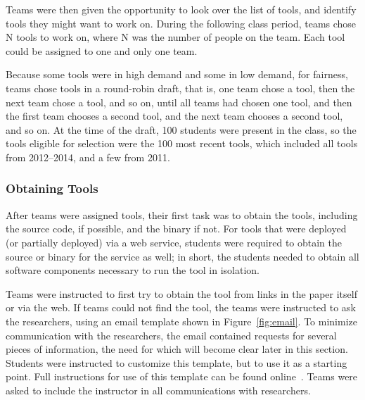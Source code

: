 \documentclass[10pt,conference]{IEEEtran}
\begin{document}
Teams were then given the opportunity to look over the list of
tools, and identify tools they might want to work on.
During the following class period, teams chose N tools to work on,
where N was the number of people on the team.
Each tool could be assigned to one and only one team.

Because some tools were in high demand and some in low demand, for fairness,
teams chose tools in a round-robin draft,
that is, one team chose a tool, then the next team chose a tool, and so on,
until all teams had chosen one tool, and then the first team chooses a second
tool, and the next team chooses a second tool, and so on.
At the time of the draft, 100 students were present in the class, so the tools eligible
for selection were the 100 most recent tools, which included all tools
from 2012--2014, and a few from 2011.

\subsubsection{Obtaining Tools}

After teams were assigned tools, their first task was to 
obtain the tools, including the source code, if possible,
and the binary if not.
For tools that were deployed (or partially deployed) via a web service, 
students were required to obtain the source or binary for
the service as well; in short, the students needed to
obtain all software components necessary to run the tool
in isolation. 

Teams were instructed to first try to 
obtain the tool from links in the paper itself or via
the web.
If teams could not find the tool, the teams
were instructed to ask the researchers, using an email
template shown in Figure~\ref{fig:email}.
To minimize communication with the researchers, 
the email contained requests for several
pieces of information, the need for which will become 
clear later in this section.
Students were instructed to customize this template,
but to use it as a starting point. 
Full instructions for use of this template can be found 
online~\cite{email}.
Teams were asked to include the instructor in
all communications with researchers.
\end{document}

